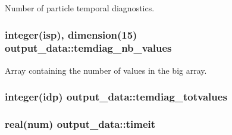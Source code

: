 Number of particle temporal diagnostics. 

\subsubsection[{\texorpdfstring{temdiag\+\_\+nb\+\_\+values}{temdiag_nb_values}}]{\setlength{\rightskip}{0pt plus 5cm}integer(isp), dimension(15) output\+\_\+data\+::temdiag\+\_\+nb\+\_\+values}\hypertarget{namespaceoutput__data_aa73fc47cc7d7d0cee7422d6fee957c48}{}\label{namespaceoutput__data_aa73fc47cc7d7d0cee7422d6fee957c48}


Array containing the number of values in the big array. 

\subsubsection[{\texorpdfstring{temdiag\+\_\+totvalues}{temdiag_totvalues}}]{\setlength{\rightskip}{0pt plus 5cm}integer(idp) output\+\_\+data\+::temdiag\+\_\+totvalues}\hypertarget{namespaceoutput__data_a85fe1c4047057dc4292320e82cae2cda}{}\label{namespaceoutput__data_a85fe1c4047057dc4292320e82cae2cda}
\subsubsection[{\texorpdfstring{timeit}{timeit}}]{\setlength{\rightskip}{0pt plus 5cm}real(num) output\+\_\+data\+::timeit}\hypertarget{namespaceoutput__data_adee8dc0fd9ff0328c325cfc24be39db3}{}\label{namespaceoutput__data_adee8dc0fd9ff0328c325cfc24be39db3}

